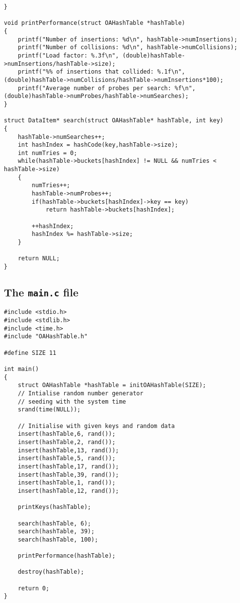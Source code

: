 \documentclass[10pt, a4paper, twosize]{article}
\begin{document}
\begin{lstlisting}
}

void printPerformance(struct OAHashTable *hashTable)
{
    printf("Number of insertions: %d\n", hashTable->numInsertions);
    printf("Number of collisions: %d\n", hashTable->numCollisions);
    printf("Load factor: %.3f\n", (double)hashTable->numInsertions/hashTable->size);
    printf("%% of insertions that collided: %.1f\n", (double)hashTable->numCollisions/hashTable->numInsertions*100);
    printf("Average number of probes per search: %f\n", (double)hashTable->numProbes/hashTable->numSearches);
}

struct DataItem* search(struct OAHashTable* hashTable, int key)
{
    hashTable->numSearches++;
    int hashIndex = hashCode(key,hashTable->size);
    int numTries = 0;
    while(hashTable->buckets[hashIndex] != NULL && numTries < hashTable->size)
    {
        numTries++;
        hashTable->numProbes++;
        if(hashTable->buckets[hashIndex]->key == key)
            return hashTable->buckets[hashIndex];
        
        ++hashIndex;
        hashIndex %= hashTable->size;
    }
    
    return NULL;
}
\end{lstlisting}
\subsection{The \texttt{main.c} file}
\begin{lstlisting}
#include <stdio.h>
#include <stdlib.h>
#include <time.h>
#include "OAHashTable.h"

#define SIZE 11

int main()
{
    struct OAHashTable *hashTable = initOAHashTable(SIZE);
    // Intialise random number generator
    // seeding with the system time
    srand(time(NULL));
    
    // Initialise with given keys and random data
    insert(hashTable,6, rand());
    insert(hashTable,2, rand());
    insert(hashTable,13, rand());
    insert(hashTable,5, rand());
    insert(hashTable,17, rand());
    insert(hashTable,39, rand());
    insert(hashTable,1, rand());
    insert(hashTable,12, rand());
    
    printKeys(hashTable);
    
    search(hashTable, 6);
    search(hashTable, 39);
    search(hashTable, 100);
    
    printPerformance(hashTable);
    
    destroy(hashTable);
    
    return 0;
}
\end{lstlisting}




\end{document}
